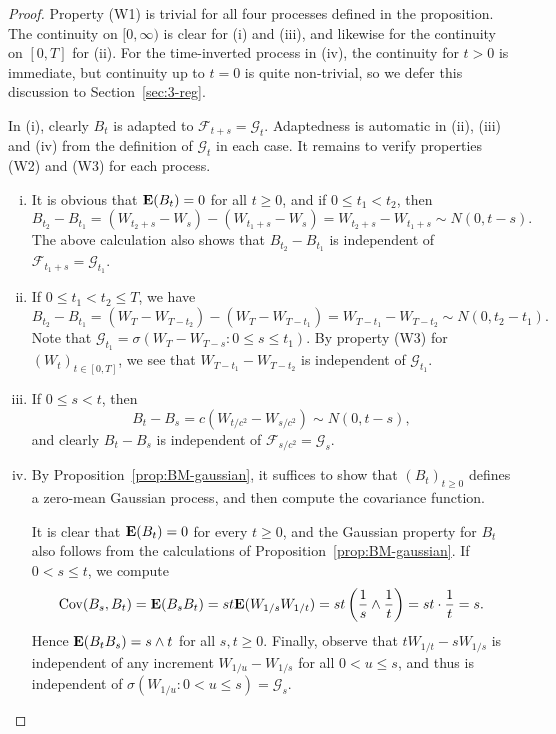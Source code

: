 \begin{proof}
Property (W1) is trivial for all four processes defined in the proposition. The continuity on $[0,\infty)$ is clear for (i) and (iii), and likewise for the continuity on $[0,T]$ for (ii). For the time-inverted process in (iv), the continuity for $t>0$ is immediate, but continuity up to $t=0$ is quite non-trivial, so we defer this discussion to Section~\ref{sec:3-reg}.

In (i), clearly $B_t$ is adapted to $\mathcal{F}_{t+s}=\mathcal{G}_t$. Adaptedness is automatic in (ii), (iii) and (iv) from the definition of $\mathcal{G}_t$ in each case. It remains to verify properties (W2) and (W3) for each process.
\begin{enumerate}[(i)]
    \item It is obvious that $\mathbf{E}(B_t)=0$ for all $t\ge 0$, and if $0\le t_1<t_2$, then
    \begin{equation*}
    B_{t_2}-B_{t_1} = (W_{t_2+s}-W_s) - (W_{t_1+s}-W_s) = W_{t_2+s}-W_{t_1+s} \sim N(0,t-s).
    \end{equation*}
    The above calculation also shows that $B_{t_2}-B_{t_1}$ is independent of $\mathcal{F}_{t_1+s}=\mathcal{G}_{t_1}$.

    \item If $0\le t_1<t_2\le T$, we have
    \begin{equation*}
        B_{t_2}-B_{t_1} = (W_T-W_{T-t_2})-(W_T-W_{T-t_1}) = W_{T-t_1}-W_{T-t_2} \sim N(0,t_2-t_1).
    \end{equation*}
    Note that $\mathcal{G}_{t_1}=\sigma(W_T-W_{T-s}:0\le s\le t_1)$. By property (W3) for $(W_t)_{t\in [0,T]}$, we see that $W_{T-t_1}-W_{T-t_2}$ is independent of $\mathcal{G}_{t_1}$.

    \item If $0\le s<t$, then
    \begin{equation*}
        B_t-B_s = c(W_{t/c^2}-W_{s/c^2}) \sim N(0, t-s),
    \end{equation*}
    and clearly $B_t-B_s$ is independent of $\mathcal{F}_{s/c^2}=\mathcal{G}_s$.

    \item By Proposition~\ref{prop:BM-gaussian}, it suffices to show that $(B_t)_{t\ge 0}$ defines a zero-mean Gaussian process, and then compute the covariance function.
    
    It is clear that $\mathbf{E}(B_t)=0$ for every $t\ge 0$, and the Gaussian property for $B_t$ also follows from the calculations of Proposition~\ref{prop:BM-gaussian}. If $0<s\le t$, we compute
    \begin{equation*}
        \operatorname{Cov}(B_s,B_t) = \mathbf{E}(B_s B_t) = st \mathbf{E}(W_{1/s}W_{1/t}) = st\left(\frac{1}{s}\wedge\frac{1}{t}\right) = st\cdot \frac{1}{t}=s.
    \end{equation*}
    Hence $\mathbf{E}(B_t B_s)=s\wedge t$ for all $s,t\ge 0$. Finally, observe that $tW_{1/t}-sW_{1/s}$ is independent of any increment $W_{1/u}-W_{1/s}$ for all $0<u\le s$, and thus is independent of $\sigma(W_{1/u}:0<u\le s)=\mathcal{G}_s$. \qedhere
\end{enumerate}
\end{proof}

